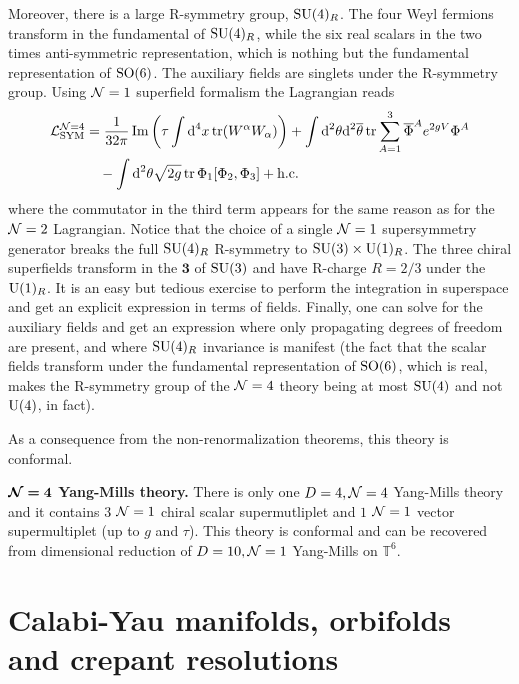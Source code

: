 \documentclass[a4paper,11pt]{article}
\begin{document}
    Moreover, there is a large R-symmetry group, $\text{SU}(4)_R$. The four Weyl fermions transform in the fundamental of $\text{SU}(4)_R$, while the six real scalars in the two times anti-symmetric representation, which is nothing but the fundamental representation of $\text{SO}(6)$. The auxiliary fields are singlets under the R-symmetry group. Using $\mathcal{N} = 1$ superfield formalism the Lagrangian reads
    \begin{align}
        \begin{split}
            \mathcal{L}^{\mathcal{N}=4}_{\text{SYM}} &= \frac{1}{32\pi}\Im \left(\tau\int\text{d}^4x\tr(W^\alpha W_\alpha)\right)+\int\text{d}^2\theta\text{d}^2\overline{\theta}\tr\sum^3_{A=1}\overline{\Phi}^Ae^{2gV}\Phi^A\\
            &\quad-\int\text{d}^2\theta\sqrt{2g}\tr\Phi_1[\Phi_2,\Phi_3]+\text{h.c.}
        \end{split}\label{eq:N4lag}
    \end{align}
    where the commutator in the third term appears for the same reason as for the $\mathcal{N} = 2$ Lagrangian. Notice that the choice of a single $\mathcal{N} = 1$ supersymmetry generator breaks the full $\text{SU}(4)_R$ R-symmetry to $\text{SU}(3)\times \text{U}(1)_R$. The three chiral superfields transform in the $\boldsymbol{3}$ of $\text{SU}(3)$ and have R-charge $R = 2/3$ under the $\text{U}(1)_R$. It is an easy but tedious exercise to perform the integration in superspace and get an explicit expression in terms of fields. Finally, one can solve for the auxiliary fields and get an expression where only propagating degrees of freedom are present, and where $\text{SU}(4)_R$ invariance is manifest (the fact that the scalar fields transform under the fundamental representation of $\text{SO}(6)$, which is real, makes the R-symmetry group of the $\mathcal{N} = 4$ theory being at most $\text{SU}(4)$ and not $\text{U}(4)$, in fact).

    As a consequence from the non-renormalization theorems, this theory is conformal.

    \begin{result}
        \textbf{$\boldsymbol{\mathcal{N}=4}$ Yang-Mills theory.} There is only one $D=4,\mathcal{N}=4$ Yang-Mills theory and it contains $3$ $\mathcal{N}=1$ chiral scalar supermutliplet and $1$ $\mathcal{N}=1$ vector supermultiplet (up to $g$ and $\tau$). This theory is conformal and can be recovered from dimensional reduction of $D=10,\mathcal{N}=1$ Yang-Mills on $\mathbb{T}^6$.
    \end{result}



\section{Calabi-Yau manifolds, orbifolds and crepant resolutions}
\end{document}
